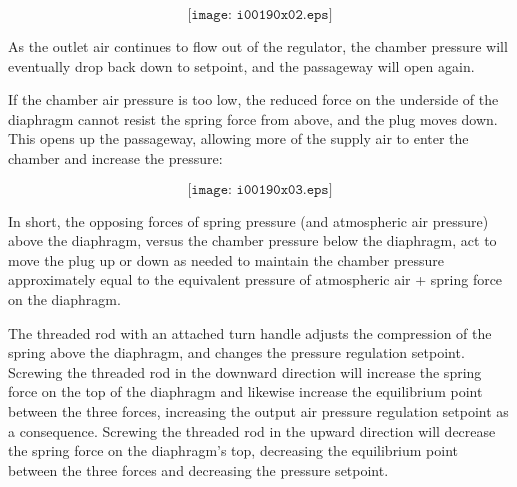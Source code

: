 $$\texttt{[image: i00190x02.eps]}$$

As the outlet air continues to flow out of the regulator, the chamber pressure will eventually drop back down to setpoint, and the passageway will open again.

If the chamber air pressure is too low, the reduced force on the underside of the diaphragm cannot resist the spring force from above, and the plug moves down.  This opens up the passageway, allowing more of the supply air to enter the chamber and increase the pressure:

$$\texttt{[image: i00190x03.eps]}$$

In short, the opposing forces of spring pressure (and atmospheric air pressure) above the diaphragm, versus the chamber pressure below the diaphragm, act to move the plug up or down as needed to maintain the chamber pressure approximately equal to the equivalent pressure of atmospheric air + spring force on the diaphragm.  

The threaded rod with an attached turn handle adjusts the compression of the spring above the diaphragm, and changes the pressure regulation setpoint.  Screwing the threaded rod in the downward direction will increase the spring force on the top of the diaphragm and likewise increase the equilibrium point between the three forces, increasing the output air pressure regulation setpoint as a consequence.  Screwing the threaded rod in the upward direction will decrease the spring force on the diaphragm's top, decreasing the equilibrium point between the three forces and decreasing the pressure setpoint.











